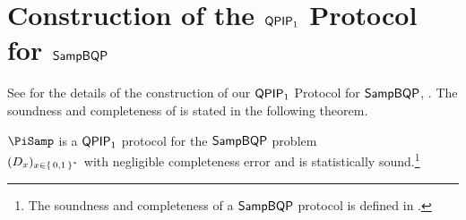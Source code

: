 \section{Construction of the $\operatorname{\mathsf{QPIP}}_1$ Protocol for $\operatorname{\mathsf{SampBQP}}$}
\label{sec:sampbqp_short}

See  for the details of the construction of our $\operatorname{\mathsf{QPIP}}_1$ Protocol for $\operatorname{\mathsf{SampBQP}}$, . The soundness and completeness of  is stated in the following theorem.

\begin{thm}
    \label{QPIP1thm}
	$\PiSamp$ is a $\operatorname{\mathsf{QPIP}}_1$ protocol for the $\operatorname{\mathsf{SampBQP}}$ problem\\ $(D_x)_{x\in\set{0,1}^*}$ with negligible completeness error and is statistically sound.\footnote{The soundness and completeness of a $\operatorname{\mathsf{SampBQP}}$ protocol is defined in .}
\end{thm}